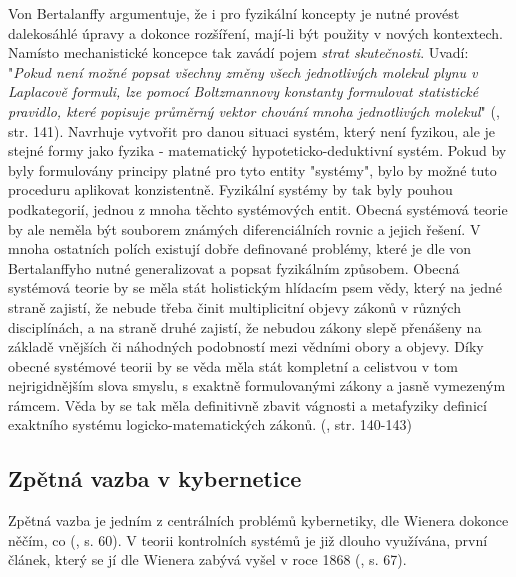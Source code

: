 \documentclass[11pt,a4paper]{article}
\begin{document}
Von Bertalanffy argumentuje, že i pro fyzikální koncepty je nutné provést dalekosáhlé úpravy a dokonce rozšíření, mají-li být použity v nových kontextech. Namísto mechanistické koncepce tak zavádí pojem \textit{strat skutečnosti}. Uvadí:  "\textit{Pokud není možné popsat všechny změny všech jednotlivých molekul plynu v Laplacově formuli, lze pomocí Boltzmannovy konstanty formulovat statistické pravidlo, které popisuje průměrný vektor chování mnoha jednotlivých molekul}" (\cite*{von_bertalanffy_outline_1950}, str. 141). Navrhuje vytvořit pro danou situaci systém, který není fyzikou, ale je stejné formy jako fyzika - matematický hypoteticko-deduktivní systém. Pokud by byly formulovány principy platné pro tyto entity "systémy", bylo by možné tuto proceduru aplikovat konzistentně. Fyzikální systémy by tak byly pouhou podkategorií, jednou z mnoha těchto systémových entit. Obecná systémová teorie by ale neměla být souborem známých diferenciálních rovnic a jejich řešení. V mnoha ostatních polích existují dobře definované problémy, které je dle von Bertalanffyho nutné generalizovat a popsat fyzikálním způsobem. Obecná systémová teorie by se měla stát holistickým hlídacím psem vědy, který na jedné straně zajistí, že nebude třeba činit multiplicitní objevy zákonů v různých disciplínách, a na straně druhé zajistí, že nebudou zákony slepě přenášeny na základě vnějších či náhodných podobností mezi vědními obory a objevy. Díky obecné systémové teorii by se věda měla stát kompletní a celistvou v tom nejrigidnějším slova smyslu, s exaktně formulovanými zákony a jasně vymezeným rámcem. Věda by se tak měla definitivně zbavit vágnosti a metafyziky definicí exaktního systému logicko-matematických zákonů. (\cite{von_bertalanffy_outline_1950}, str. 140-143)


\subsubsection{}


\subsection{Zpětná vazba v kybernetice}

Zpětná vazba je jedním z centrálních problémů kybernetiky, dle Wienera dokonce něčím, co (\cite{wiener_cybernetics_2019}, s. 60). 
V teorii kontrolních systémů je již dlouho využívána, první článek, který se jí dle Wienera zabývá vyšel v roce 1868 (\cite{maxwell_governors_1868, wiener_cybernetics_2019}, s. 67). 
\end{document}
